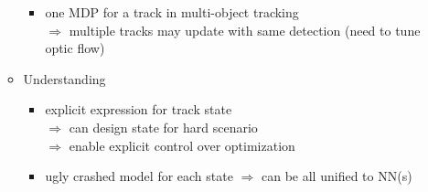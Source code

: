 \begin{itemize}
\begin{itemize}
\begin{itemize}
		\item one MDP for a track in multi-object tracking \\
		$\Rightarrow$ multiple tracks may update with same detection (need to tune optic flow)
		\end{itemize}
	\item Understanding
		\begin{itemize}
		\item explicit expression for track state \\
		$\Rightarrow$ can design state for hard scenario \\
		$\Rightarrow$ enable explicit control over optimization
		\item ugly crashed model for each state $\Rightarrow$ can be all unified to NN(s)
		\end{itemize}
	\end{itemize}


\end{itemize}
